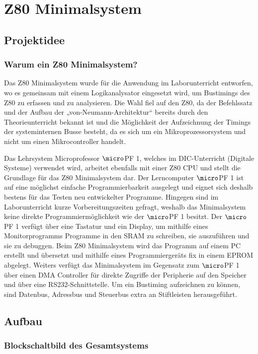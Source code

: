 \section{Z80 Minimalsystem}
\label{sec:z80}
\subsection{Projektidee}
\label{sec:z80-idee}
\subsubsection{Warum ein Z80 Minimalsystem?}
\label{sec:z80-warum}
Das Z80 Minimalsystem wurde für die Anwendung im Laborunterricht entworfen, wo es gemeinsam mit einem Logikanalysator eingesetzt wird, um Bustimings des Z80 zu erfassen und zu analysieren. Die Wahl fiel auf den Z80, da der Befehlssatz und der Aufbau der „von-Neumann-Architektur“ bereits durch den Theorieunterricht bekannt ist und die Möglichkeit der Aufzeichnung der Timings der systeminternen Busse besteht, da es sich um ein Mikroprozessorsystem und nicht um einen Mikrocontroller handelt.

Das Lehrsystem Microprofessor $\micro$PF 1, welches im DIC-Unterricht (Digitale Systeme) verwendet wird, arbeitet ebenfalls mit einer Z80 CPU und stellt die Grundlage für das Z80 Minimalsystem dar. Der Lerncomputer $\micro$PF 1 ist auf eine möglichst einfache Programmierbarkeit ausgelegt und eignet sich deshalb bestens für das Testen neu entwickelter Programme. Hingegen sind im Laborunterricht kurze Vorbereitungszeiten gefragt, weshalb das Minimalsystem keine direkte Programmiermöglichkeit wie der $\micro$PF 1 besitzt. Der $\micro$PF 1 verfügt über eine Tastatur und ein Display, um mithilfe eines Monitorprogramms Programme in den SRAM zu schreiben, sie auszuführen und sie zu debuggen. Beim Z80 Minimalsystem wird das Programm auf einem PC erstellt und übersetzt und mithilfe eines Programmiergeräts fix in einem EPROM abgelegt. Weiters verfügt das Minimalsystem im Gegensatz zum $\micro$PF 1 über einen DMA Controller für direkte Zugriffe der Peripherie auf den Speicher und über eine RS232-Schnittstelle. Um ein Bustiming aufzeichnen zu können, sind Datenbus, Adressbus und Steuerbus extra an Stiftleisten herausgeführt.

\subsection{Aufbau}
\label{sec:z80-aufbau}
\subsubsection{Blockschaltbild des Gesamtsystems}
\label{sec:z80-bsb}

